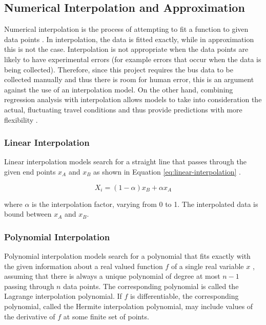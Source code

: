 \subsection{Numerical Interpolation and Approximation}

Numerical interpolation is the process of attempting to fit a function to given data points \cite{intro-to-numerical-analysis-atkinson}. In interpolation, the data is fitted exactly, while in approximation this is not the case. Interpolation is not appropriate when the data points are likely to have experimental errors (for example errors that occur when the data is being collected). Therefore, since this project requires the bus data to be collected manually and thus there is room for human error, this is an argument against the use of an interpolation model. On the other hand, combining regression analysis with interpolation allows models to take into consideration the actual, fluctuating travel conditions and thus provide predictions with more flexibility \cite{aviation-regresion-interpolation}.

\subsubsection{Linear Interpolation}

Linear interpolation models search for a straight line that passes through the given end points $x_A$ and $x_B$ as shown in Equation \ref{eq:linear-interpolation} \cite{interpolation-in-time-series}.

\begin{equation}
    \label{eq:linear-interpolation}
    X_i = (1-\alpha)x_B + \alpha x_A
\end{equation}

where $\alpha$ is the interpolation factor, varying from 0 to 1. The interpolated data is bound between $x_A$ and $x_B$.

\subsubsection{Polynomial Interpolation}

Polynomial interpolation models search for a polynomial that fits exactly with the given information about a real valued function $f$ of a single real variable $x$ \cite{intro-to-numerical-analysis-suli}, assuming that there is always a unique polynomial of degree at most $n-1$ passing through $n$ data points. The corresponding polynomial is called the Lagrange interpolation polynomial. If $f$ is differentiable, the corresponding polynomial, called the Hermite interpolation polynomial, may include values of the derivative of $f$ at some finite set of points. \\

